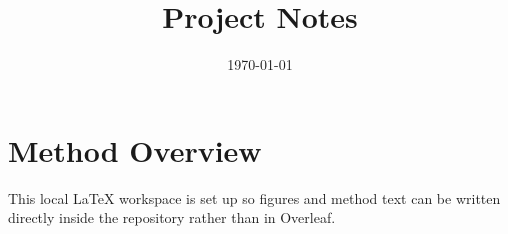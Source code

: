 \documentclass[11pt]{article}
\title{Project Notes}
\author{}
\date{\today}
\begin{document}
\maketitle

\section{Method Overview}

This local LaTeX workspace is set up so figures and method text can be written directly inside the repository rather than in Overleaf.


\end{document}

